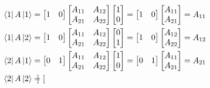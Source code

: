 \documentclass[../main.tex]{subfiles}
\begin{document}
\begin{align*}
	\bra{1}A \ket{1}&=
	\begin{bmatrix}
		1&0	
	\end{bmatrix} 
	\begin{bmatrix}
		A_{11}&A_{12}\\
		A_{21}&A_{22}
	\end{bmatrix}
	\begin{bmatrix}
		1\\
		0
	\end{bmatrix} 
	=
	\begin{bmatrix}
		1&0
	\end{bmatrix}
	\begin{bmatrix}
		A_{11}\\
		A_{21}
	\end{bmatrix}
	=A_{11}\\
	\bra{1}A \ket{2}&=
	\begin{bmatrix}
		1&0	
	\end{bmatrix} 
	\begin{bmatrix}
		A_{11}&A_{12}\\
		A_{21}&A_{22}
	\end{bmatrix}
	\begin{bmatrix}
		0\\
		1
	\end{bmatrix} 
	=
	\begin{bmatrix}
		1&0
	\end{bmatrix}
	\begin{bmatrix}
		A_{12}\\
		A_{22}
	\end{bmatrix}
	=A_{12}\\
	\bra{2}A \ket{1}&=
	\begin{bmatrix}
		0&1	
	\end{bmatrix} 
	\begin{bmatrix}
		A_{11}&A_{12}\\
		A_{21}&A_{22}
	\end{bmatrix}
	\begin{bmatrix}
		1\\
		0
	\end{bmatrix} 
	=
	\begin{bmatrix}
		0&1
	\end{bmatrix}
	\begin{bmatrix}
		A_{11}\\
		A_{21}
	\end{bmatrix}
	=A_{21}\\
	\bra{2}A \ket{2}&=
	\begin{bmatrix}

\end{bmatrix}
\end{align*}
\end{document}
